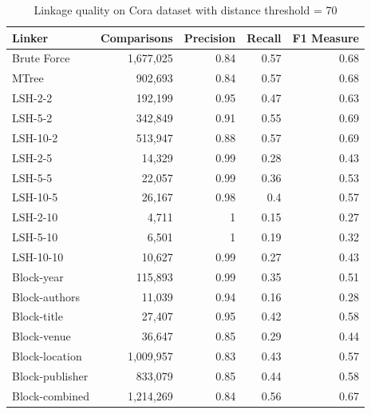 \documentclass{llncs}
\begin{document}
\begin{table}[ht]
\centering
\begin{tabular}{l|r|r|r|r}
\parbox{0.2\textwidth}{\centering Linker} &
\parbox{0.2\textwidth}{\centering Comparisons} &
\parbox{0.17\textwidth}{\centering Precision} &
\parbox{0.17\textwidth}{\centering Recall} &
\parbox{0.17\textwidth}{\centering F1 Measure} \\ \hline \hline
Brute Force        & 1,677,025                 & 0.84      & 0.57   & 0.68       \\ \hline
MTree              &  902,693                  & 0.84      & 0.57   & 0.68       \\ \hline
LSH-2-2            &  192,199	& 0.95	& 0.47	& 0.63       \\
LSH-5-2            &  342,849	& 0.91	& 0.55	& 0.69       \\
LSH-10-2           &  513,947	& 0.88	& 0.57	& 0.69       \\
LSH-2-5            &  14,329	& 0.99	& 0.28	& 0.43      \\
LSH-5-5            &  22,057	& 0.99	& 0.36	& 0.53       \\
LSH-10-5           &  26,167	& 0.98	& 0.4	& 0.57      \\
LSH-2-10           &  4,711	& 1	& 0.15	& 0.27    \\
LSH-5-10           &  6,501	& 1	& 0.19	& 0.32      \\
LSH-10-10          & 10,627  	& 0.99	& 0.27& 	0.43       \\  \hline
Block-year         &  115,893                  & 0.99      & 0.35   & 0.51       \\
Block-authors      &   11,039                   & 0.94      & 0.16   & 0.28       \\
Block-title        &   27,407                   & 0.95      & 0.42   & 0.58       \\
Block-venue        &   36,647                   & 0.85      & 0.29   & 0.44       \\
Block-location     & 1,009,957                 & 0.83      & 0.43   & 0.57       \\
Block-publisher    &  833,079                  & 0.85      & 0.44   & 0.58       \\
Block-combined     & 1,214,269                 & 0.84      & 0.56   & 0.67       \\ \hline
\end{tabular}
\caption{Linkage quality on Cora dataset with distance threshold = 70
\label{comparison-of-results-cora}
}
\end{table}
\end{document}
